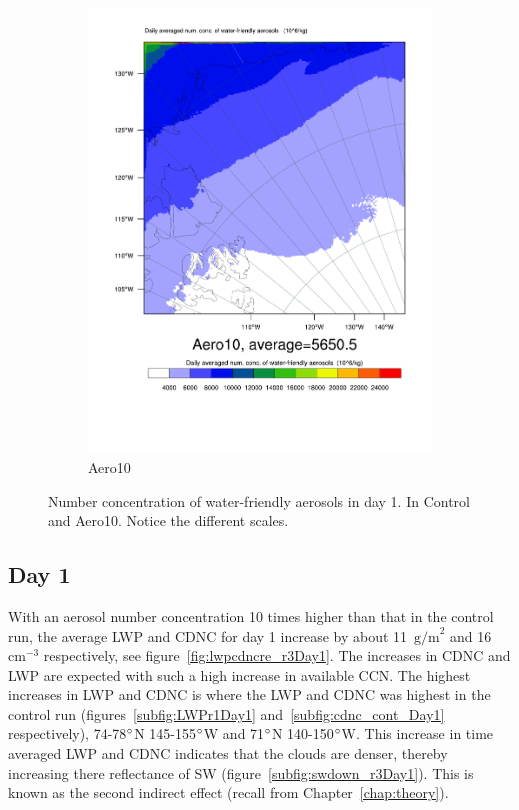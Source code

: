 \begin{figure}[hb]
\begin{subfigure}{0.48\textwidth}
		\includegraphics[width=\textwidth]{results/Aero10/Aero10_QNWFA_Day1.pdf}
		\caption{Aero10}
		\label{subfig:qnwfa_r3}
	\end{subfigure}
\caption{Number concentration of water-friendly aerosols in day 1. In Control and Aero10. Notice the different scales.}
\label{fig:aerosols}
\end{figure}


\subsection{Day 1}
With an aerosol number concentration 10 times higher than that in the control run, the average LWP and CDNC for day 1 increase by about 11~$\text{g/m}^2$ and 16~$\text{cm}^{-3}$ respectively, see figure~\ref{fig:lwpcdncre_r3Day1}. The increases in CDNC and LWP are expected with such a high increase in available CCN. The highest increases in LWP and CDNC is where the LWP and CDNC was highest in the control run (figures~\ref{subfig:LWPr1Day1} and~\ref{subfig:cdnc_cont_Day1} respectively), 74-78$\degree$N 145-155$\degree$W and 71$\degree$N 140-150$\degree$W. This increase in time averaged LWP and CDNC indicates that the clouds are denser, thereby increasing there reflectance of SW (figure~\ref{subfig:swdown_r3Day1}). This is known as the second indirect effect (recall from Chapter~\ref{chap:theory}).

